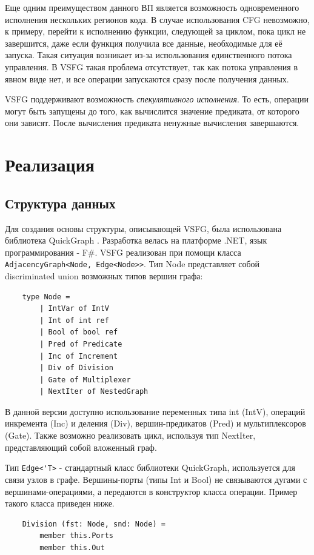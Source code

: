 \documentclass{matmex-diploma-custom}
\begin{document}
Еще одним преимуществом данного ВП является возможность одновременного исполнения нескольких регионов кода. В случае использования CFG невозможно, к примеру, перейти к исполнению функции, следующей за циклом, пока цикл не завершится, даже если функция получила все данные, необходимые для её запуска. Такая ситуация возникает из-за использования единственного потока управления. В VSFG такая проблема отсутствует, так как потока управления в явном виде нет, и все операции запускаются сразу после получения данных.

VSFG поддерживают возможность \textit{спекулятивного исполнения}. То есть, операции могут быть запущены до того, как вычислится значение предиката, от которого они зависят. После вычисления предиката ненужные вычисления завершаются. 

\section{Реализация}

\subsection{Структура данных}
Для создания основы структуры, описывающей VSFG, была использована библиотека QuickGraph \cite{quickgraph}. Разработка велась на платформе .NET, язык программирования - F\#. 
VSFG реализован при помощи класса \verb|AdjacencyGraph<Node, Edge<Node>>|. Тип Node представляет собой discriminated union возможных типов вершин графа:
\begin{verbatim}
    type Node =
        | IntVar of IntV
        | Int of int ref
        | Bool of bool ref
        | Pred of Predicate
        | Inc of Increment
        | Div of Division
        | Gate of Multiplexer
        | NextIter of NestedGraph
\end{verbatim}
В данной версии доступно использование переменных типа int (IntV), операций инкремента (Inc) и деления (Div), вершин-предикатов (Pred) и мультиплексоров (Gate). Также возможно реализовать цикл, используя тип NextIter, представляющий собой вложенный граф. 

Тип \verb|Edge<'T>| - стандартный класс библиотеки QuickGraph, используется для связи узлов в графе. Вершины-порты (типы Int и Bool) не связываются дугами с вершинами-операциями, а передаются в конструктор класса операции. Пример такого класса приведен ниже.

\begin{verbatim}
    Division (fst: Node, snd: Node) =
        member this.Ports
        member this.Out
\end{verbatim}
\end{document}
